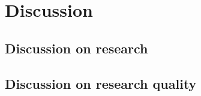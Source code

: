 \chapter{Discussion}
\label{ch:discussion}
\lipsum[1]

\section{Discussion on research}
\label{sec:discussiononresearch}
\lipsum[1]

\section{Discussion on research quality}
\label{sec:discusssionresearchquality}
\lipsum[1]

